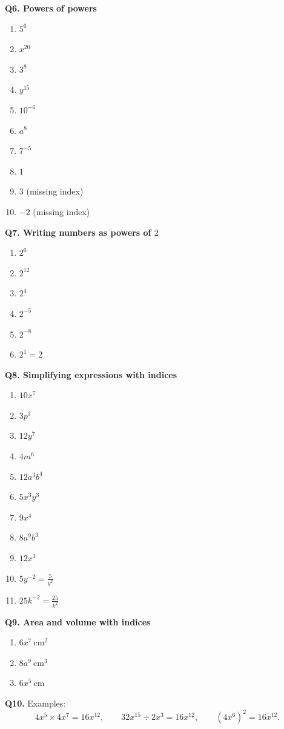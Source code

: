 \documentclass[12pt,a4paper]{article}
\begin{document}
\textbf{Q6. Powers of powers}
\begin{enumerate}
\item \(5^6\)
\item \(x^{20}\)
\item \(3^8\)
\item \(y^{15}\)
\item \(10^{-6}\)
\item \(a^8\)
\item \(7^{-5}\)
\item \(1\)
\item \(3\) \quad (missing index)
\item \(-2\) \quad (missing index)
\end{enumerate}

\textbf{Q7. Writing numbers as powers of \(2\)}
\begin{enumerate}
\item \(2^6\)
\item \(2^{12}\)
\item \(2^4\)
\item \(2^{-5}\)
\item \(2^{-8}\)
\item \(2^1=2\)
\end{enumerate}

\textbf{Q8. Simplifying expressions with indices}
\begin{enumerate}
\item \(10x^7\)
\item \(3p^3\)
\item \(12y^7\)
\item \(4m^6\)
\item \(12a^3b^4\)
\item \(5x^3y^3\)
\item \(9x^4\)
\item \(8a^9b^3\)
\item \(12x^3\)
\item \(5y^{-2}=\frac{5}{y^2}\)
\item \(25k^{-2}=\frac{25}{k^2}\)
\end{enumerate}

\textbf{Q9. Area and volume with indices}
\begin{enumerate}
\item \(6x^7\ \text{cm}^2\)
\item \(8a^9\ \text{cm}^3\)
\item \(6x^5\ \text{cm}\)
\end{enumerate}

\textbf{Q10.} Examples:
\[
4x^5\times4x^7=16x^{12},\qquad
32x^{15}\div2x^3=16x^{12},\qquad
(4x^6)^2=16x^{12}.
\]
\end{document}

